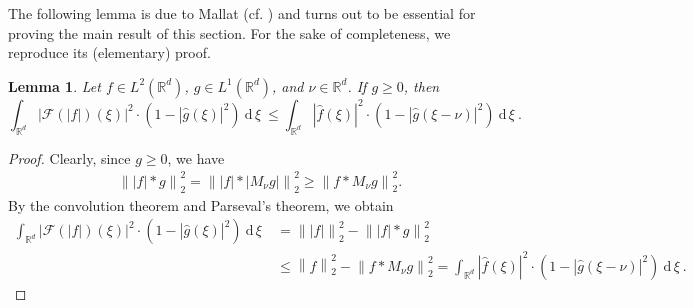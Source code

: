\documentclass[11pt]{amsart}
\newcommand{\R}{{\mathbb{R}}}
\newcommand{\dxi}{\:\mathrm{d}\,\xi\:}
\newcommand{\abs}[1]{\ensuremath{\left|\text{}#1\text{}\right|}}
\newcommand{\norm}[1]{\ensuremath{\left\lVert\text{}#1\text{}\right\rVert}}
\newtheorem{lemma}[theorem]{Lemma}
\newenvironment{proof sketch} {\textit{Proof sketch.}}{}
\begin{document}
  The following lemma is due to Mallat (cf. \cite[Lemma 2.7]{mallat2012group}) and turns out to be essential for proving the main result of this section. For the sake of completeness, we reproduce its (elementary) proof.
  
  \begin{lemma}\label{lem: Extension of Mallat's lemma}
    Let $f\in L^2(\R^d)$, $g \in L^1(\R^d)$, and $\nu \in \R^d$. If $g \geq 0$, then 
    \[\int_{\R^d} \abs{\mathcal{F}(|f|)(\xi)}^2 \cdot \left(1-\abs{\widehat{g}(\xi)}^2\right) \dxi 
    \leq
    \int_{\R^d} \abs{\widehat{f}(\xi)}^2 \cdot \left(1-\abs{\widehat{g}(\xi-\nu)}^2\right) \dxi.\]
  \end{lemma}
  
  \begin{proof}
    Clearly, since $g\geq 0$, we have 
    \begin{align*}
      \norm{|f|*g}_2^2 
      = \norm{|f|*|M_\nu g|}_2^2 
      \geq \norm{f*M_\nu g}_2^2.
    \end{align*}
    By the convolution theorem and Parseval's theorem, we obtain
    \begin{align*}
      \int_{\R^d} \abs{\mathcal{F}(|f|)(\xi)}^2 \cdot \left(1-\abs{\widehat{g}(\xi)}^2\right) \dxi &= \norm{|f|}_2^2-\norm{|f|*g}_2^2 \\
      &\leq \norm{f}_2^2 - \norm{f*M_\nu g}_2^2 =
      \int_{\R^d} \abs{\widehat{f}(\xi)}^2 \cdot \left(1-\abs{\widehat{g}(\xi-\nu)}^2\right) \dxi.
    \end{align*}
  \end{proof}
  
\end{document}
